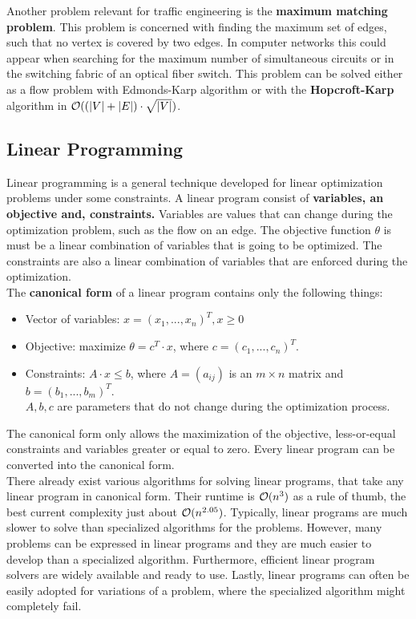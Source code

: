 Another problem relevant for traffic engineering is the \textbf{maximum matching problem}. This problem is concerned with finding the maximum set of edges, such that no vertex is covered by two edges. In computer networks this could appear when searching for the maximum number of simultaneous circuits or in the switching fabric of an optical fiber switch. This problem can be solved either as a flow problem with Edmonds-Karp algorithm or with the \textbf{Hopcroft-Karp} algorithm in $\mathcal{O}((|V| + |E|)\cdot \sqrt{|V|})$.


\subsection{Linear Programming}
Linear programming is a general technique developed for linear optimization problems under some constraints. A linear program consist of \textbf{variables, an objective and, constraints.} Variables are values that can change during the optimization problem, such as the flow on an edge. The objective function $\theta$ is must be a linear combination of variables that is going to be optimized. The constraints are also a linear combination of variables that are enforced during the optimization.\\
The \textbf{canonical form} of a linear program contains only the following things:
\begin{itemize}
\item Vector of variables: $x = (x_1, ..., x_n)^T, x \geq 0$
\item Objective: maximize $\theta = c^T \cdot x$, where $c = (c_1, ..., c_n)^T$.
\item Constraints: $A \cdot x \leq b$, where $A = (a_{ij})$ is an $m \times n$ matrix and $b = (b_1, ..., b_m)^T$.\\
$A, b, c$ are parameters that do not change during the optimization process.
\end{itemize}
The canonical form only allows the maximization of the objective, less-or-equal constraints and variables greater or equal to zero. Every linear program can be converted into the canonical form. \vspace{.3cm}\\

There already exist various algorithms for solving linear programs, that take any linear program in canonical form. Their runtime is $\mathcal{O} (n^3)$ as a rule of thumb, the best current complexity just about $\mathcal{O} (n^{2.05})$. Typically, linear programs are much slower to solve than specialized algorithms for the problems. However, many problems can be expressed in linear programs and they are much easier to develop than a specialized algorithm. Furthermore, efficient linear program solvers are widely available and ready to use. Lastly, linear programs can often be easily adopted for variations of a problem, where the specialized algorithm might completely fail.

